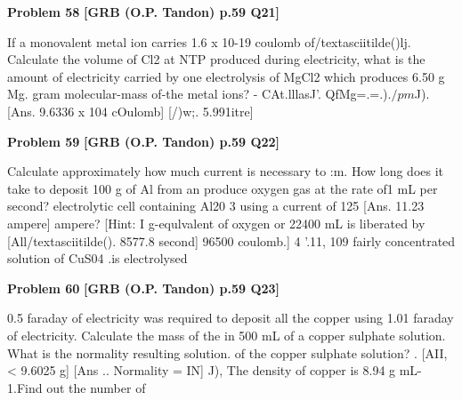 \begin{problembox}
\textbf{Problem 58} \hfill \textbf{[GRB (O.P. Tandon) p.59 Q21]}
\label{q:ext-grb_all_questions-58}

If a monovalent metal ion carries 1.6 x 10-19 coulomb of/textasciitilde()lj. Calculate the volume of Cl2 at NTP produced during 
electricity, what is the amount of electricity carried by one 
electrolysis of MgCl2 which produces 6.50 g Mg. 
gram molecular-mass of-the metal ions? -
CAt.lllasJ'. QfMg=.=.).$/pm$J).\underline{\hspace{1cm}} \underline{\hspace{1cm}} \underline{\hspace{1cm}} 
[Ans. 9.6336 x 104 cOulomb] 
[/)w;. 5.991itre]
\end{problembox}

\begin{problembox}
\textbf{Problem 59} \hfill \textbf{[GRB (O.P. Tandon) p.59 Q22]}
\label{q:ext-grb_all_questions-59}

Calculate approximately how much current is necessary to 
:m. How long does it take to deposit 100 g of Al from an 
produce oxygen gas at the rate of1 mL per second? 
electrolytic cell containing Al20 3 using a current of 125 
[Ans. 
11.23 ampere] 
ampere? 
[Hint: 
I g-equlvalent of oxygen or 22400 mL is liberated by 
[All/textasciitilde(). 8577.8 second] 
96500 coulomb.] 
4 
'.11, 109 fairly concentrated solution of CuS04 .is electrolysed
\end{problembox}

\begin{problembox}
\textbf{Problem 60} \hfill \textbf{[GRB (O.P. Tandon) p.59 Q23]}
\label{q:ext-grb_all_questions-60}

0.5 faraday of electricity was required to deposit all the copper 
using 1.01 faraday of electricity. Calculate the mass of the 
in 500 mL of a copper sulphate solution. What is the normality 
resulting solution. 
of the copper sulphate solution? 
. 
[AII,< 9.6025 g] 
[Ans .. Normality = IN] 
J), The density of copper is 8.94 g mL-1.Find out the number of
\end{problembox}


